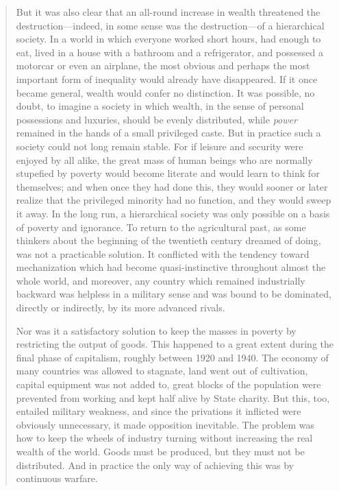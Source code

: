 \begin{paracol}{2}
\begin{quotation}
But it was also clear that an all-round increase in wealth threatened
the destruction---indeed, in some sense was the destruction---of a
hierarchical society. In a world in which everyone worked short hours,
had enough to eat, lived in a house with a bathroom and a refrigerator,
and possessed a motorcar or even an airplane, the most obvious and
perhaps the most important form of inequality would already have
disappeared. If it once became general, wealth would confer no
distinction. It was possible, no doubt, to imagine a society in which
wealth, in the sense of personal possessions and luxuries, should be
evenly distributed, while \emph{power} remained in the hands of a small
privileged caste. But in practice such a society could not long remain
stable. For if leisure and security were enjoyed by all alike, the great
mass of human beings who are normally stupefied by poverty would become
literate and would learn to think for themselves; and when once they had
done this, they would sooner or later realize that the privileged
minority had no function, and they would sweep it away. In the long run,
a hierarchical society was only possible on a basis of poverty and
ignorance. To return to the agricultural past, as some thinkers about
the beginning of the twentieth century dreamed of doing, was not a
practicable solution. It conflicted with the tendency toward
mechanization which had become quasi-instinctive throughout almost the
whole world, and moreover, any country which remained industrially
backward was helpless in a military sense and was bound to be dominated,
directly or indirectly, by its more advanced rivals.\par
Nor was it a satisfactory solution to keep the masses in poverty by
restricting the output of goods. This happened to a great extent during
the final phase of capitalism, roughly between 1920 and 1940. The
economy of many countries was allowed to stagnate, land went out of
cultivation, capital equipment was not added to, great blocks of the
population were prevented from working and kept half alive by State
charity. But this, too, entailed military weakness, and since the
privations it inflicted were obviously unnecessary, it made opposition
inevitable. The problem was how to keep the wheels of industry turning
without increasing the real wealth of the world. Goods must be produced,
but they must not be distributed. And in practice the only way of
achieving this was by continuous warfare.
\end{quotation}


\end{paracol}
